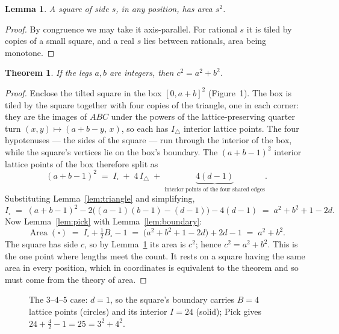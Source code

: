 \documentclass[11pt,a4paper]{article}
\newtheorem{lemma}{Lemma}
\newtheorem{theorem}{Theorem}
\theoremstyle{remark}
\begin{document}
\begin{lemma}\label{lem:square}
A square of side $s$, in any position, has area $s^2$.
\end{lemma}

\begin{proof}
By congruence we may take it axis-parallel. For rational $s$ it is tiled by
copies of a small square, and a real $s$ lies between rationals, area being
monotone.
\end{proof}

\begin{theorem}\label{thm:integer}
If the legs $a,b$ are integers, then $c^2=a^2+b^2$.
\end{theorem}

\begin{proof}
Enclose the tilted square in the box $[0,a+b]^2$ (Figure~1). The box is tiled
by the square together with four copies of the triangle, one in each corner:
they are the images of $ABC$ under the powers of the lattice-preserving quarter
turn $(x,y)\mapsto(a+b-y,\,x)$, so each has $I_{\triangle}$ interior lattice
points. The four hypotenuses --- the sides of the square --- run through the
interior of the box, while the square's vertices lie on the box's boundary. The
$(a+b-1)^2$ interior lattice points of the box therefore split as
\[
(a+b-1)^2 \;=\; I_{\square} \;+\; 4\,I_{\triangle}
\;+\; \underbrace{4(d-1)}_{\text{interior points of the four shared edges}}.
\]
Substituting Lemma~\ref{lem:triangle} and simplifying,
\[
I_{\square} \;=\; (a+b-1)^2-2\bigl((a-1)(b-1)-(d-1)\bigr)-4(d-1)
\;=\; a^2+b^2+1-2d .
\]
Now Lemma~\ref{lem:pick} with Lemma~\ref{lem:boundary}:
\[
\operatorname{Area}(\square)\;=\;I_{\square}+\tfrac12B_{\square}-1
\;=\;\bigl(a^2+b^2+1-2d\bigr)+2d-1\;=\;a^2+b^2 .
\]
The square has side $c$, so by Lemma~\ref{lem:square} its area is $c^2$; hence
$c^2=a^2+b^2$. This is the one point where lengths meet the count. It rests on a
square having the same area in every position, which in coordinates is
equivalent to the theorem and so must come from the theory of area.
\end{proof}

\begin{figure}[ht]
\centering
{}
\caption{The $3$--$4$--$5$ case: $d=1$, so the square's boundary carries
$B=4$ lattice points (circles) and its interior $I=24$ (solid);
Pick gives $24+\tfrac42-1=25=3^2+4^2$.}
\end{figure}
\end{document}
